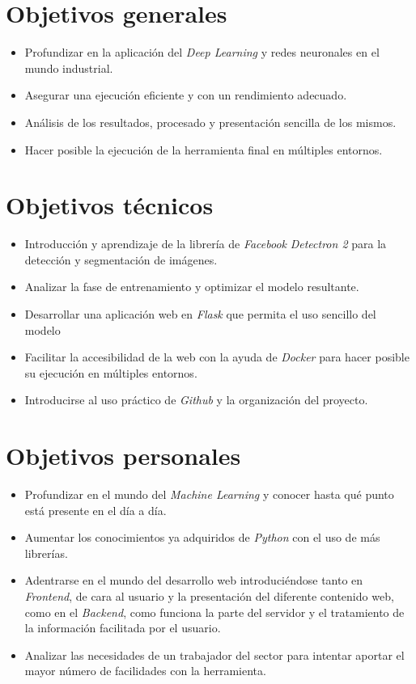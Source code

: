 
\section{Objetivos generales}

\begin{itemize}
	\item Profundizar en la aplicación del \emph{Deep Learning} y redes neuronales en el mundo industrial.
	\item Asegurar una ejecución eficiente y con un rendimiento adecuado.
	\item Análisis de los resultados, procesado y presentación sencilla de los mismos.
	\item Hacer posible la ejecución de la herramienta final en múltiples entornos.
\end{itemize}

\section{Objetivos técnicos}

\begin{itemize}
    \item Introducción y aprendizaje de la librería de \emph{Facebook} \emph{Detectron 2} para la detección y segmentación de imágenes.
    \item Analizar la fase de entrenamiento y optimizar el modelo resultante.
    \item Desarrollar una aplicación web en \emph{Flask} que permita el uso sencillo del modelo
    \item Facilitar la accesibilidad de la web con la ayuda de \emph{Docker} para hacer posible su ejecución en múltiples entornos.
    \item Introducirse al uso práctico de \emph{Github} y la organización del proyecto.
\end{itemize}

\section{Objetivos personales}

\begin{itemize}
    \item Profundizar en el mundo del \emph{Machine Learning} y conocer hasta qué punto está presente en el día a día.
    \item Aumentar los conocimientos ya adquiridos de \emph{Python} con el uso de más librerías.
    \item Adentrarse en el mundo del desarrollo web introduciéndose tanto en \emph{Frontend}, de cara al usuario y la presentación del diferente contenido web, como en el \emph{Backend}, como funciona la parte del servidor y el tratamiento de la información facilitada por el usuario.
    \item Analizar las necesidades de un trabajador del sector para intentar aportar el mayor número de facilidades con la herramienta.
\end{itemize}
